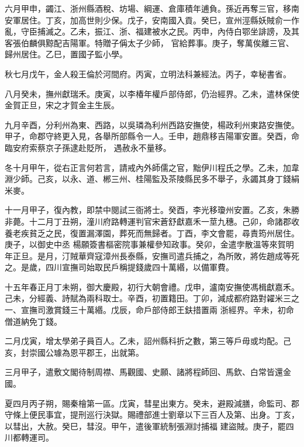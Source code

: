 \begin{pinyinscope}
 六月甲申，蠲江、浙州縣酒稅、坊場、綱運、倉庫積年逋負。孫近再奪三官，移南安軍居住。丁亥，加高世則少保。戊子，安南國入貢。癸巳，宣州涇縣妖賊俞一作亂，守臣捕滅之。乙未，振江、浙、福建被水之民。丙申，內侍白鄂坐誹謗，及其客張伯麟俱黥配吉陽軍。特贈子偁太子少師，
 官給葬事。庚子，奪萬俟離三官、歸州居住。乙巳，置國子監小學。



 秋七月戊午，金人殺王倫於河間府。丙寅，立明法科兼經法。丙子，幸秘書省。



 八月癸未，撫州獻瑞禾。庚寅，以李椿年權戶部侍郎，仍治經界。乙未，遣林保使金賀正旦，宋之才賀金主生辰。



 九月辛酉，分利州為東、西路，以吳璘為利州西路安撫使，楊政利州東路安撫使。甲子，命郡守終更入見，各舉所部縣令一人。壬申，趙鼎移吉陽軍安置。癸酉，命臨安府索蔡京子孫逮赴貶所，
 遇赦永不量移。



 冬十月甲午，從右正言何若言，請戒內外師儒之官，黜伊川程氏之學。乙未，加韋淵少師。己亥，以永、道、郴三州、桂陽監及茶陵縣民多不舉子，永蠲其身丁錢絹米麥。



 十一月甲子，復內教，即禁中閱試三衙將士。癸酉，李光移瓊州安置。乙亥，朱勝非薨。十二月丁丑朔，潼川府路轉運判官宋蒼舒獻嘉禾一莖九穗。己卯，命諸郡收養老疾貧乏之民，復置漏澤園，葬死而無歸者。丁酉，李文會罷，尋責筠州居住。庚子，以御史中丞
 楊願簽書樞密院事兼權參知政事。癸卯，金遣孛散溫等來賀明年正旦。是月，汀賊華齊寇漳州長泰縣，安撫司遣兵捕之，為所敗，將佐趙成等死之。是歲，四川宣撫司始取民戶稱提錢歲四十萬緡，以備軍費。



 十五年春正月丁未朔，御大慶殿，初行大朝會禮。戊申，瀘南安撫使馮楫獻嘉禾。己未，分經義、詩賦為兩科取士。辛酉，初置籍田。丁卯，減成都府路對糴米三之一、宣撫司激賞錢三十萬緡。戊辰，命戶部侍郎王鈇措置兩
 浙經界。辛未，初命僧道納免丁錢。



 二月戊寅，增太學弟子員百人。乙未，詔州縣科折之數，第三等戶毋或均配。己亥，封崇國公璩為恩平郡王，出就第。



 三月甲子，遣敷文閣待制周襟、馬觀國、史願、諸將程師回、馬欽、白常皆還金國。



 夏四月丙子朔，賜秦檜第一區。戊寅，彗星出東方。癸未，避殿減膳，命監司、郡守條上便民事宜，提刑巡行決獄。賜禮部進士劉章以下三百人及第、出身。丁亥，以彗出，大赦。癸巳，彗沒。甲午，遣後軍統制張淵討捕福
 建盜賊。庚子，罷四川都轉運司。




\end{pinyinscope}

